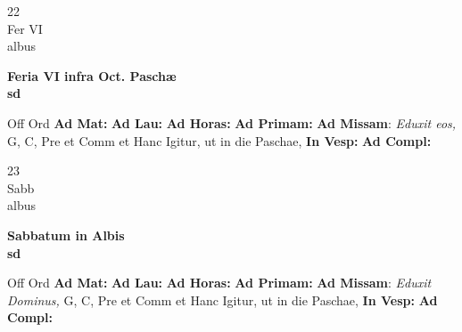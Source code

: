 \documentclass[10pt, openany]{book}
\begin{document}
    \begin{center}
        \begin{minipage}{3.5in}
            \vspace{2em}
            \begin{minipage}{0.5in}
                {\Huge 22} \\
                {\normalsize Fer VI} \\
                {\normalsize albus}
            \end{minipage}
            \begin{minipage}{3.0in}
                \textbf{ \large Feria VI infra Oct. Paschæ \\
                \textnormal{\normalsize sd}} \\ 
            \end{minipage}
            \begin{justify}Off Ord
                \textbf{Ad Mat: }
                \textbf{Ad Lau: }
                \textbf{Ad Horas: }
                \textbf{Ad Primam: }\textbf{Ad Missam}: \textit{Eduxit eos,} G, C, Pre et Comm et Hanc Igitur, ut in die Paschae,  
                \textbf{In Vesp: }
                \textbf{Ad Compl: }
            \end{justify}
        \end{minipage}
    \end{center}

    \begin{center}
        \begin{minipage}{3.5in}
            \vspace{2em}
            \begin{minipage}{0.5in}
                {\Huge 23} \\
                {\normalsize Sabb} \\
                {\normalsize albus}
            \end{minipage}
            \begin{minipage}{3.0in}
                \textbf{ \large Sabbatum in Albis \\
                \textnormal{\normalsize sd}} \\ 
            \end{minipage}
            \begin{justify}Off Ord
                \textbf{Ad Mat: }
                \textbf{Ad Lau: }
                \textbf{Ad Horas: }
                \textbf{Ad Primam: }\textbf{Ad Missam}: \textit{Eduxit Dominus,} G, C, Pre et Comm et Hanc Igitur, ut in die Paschae,  
                \textbf{In Vesp: }
                \textbf{Ad Compl: }
            \end{justify}
        \end{minipage}
    \end{center}
\end{document}
